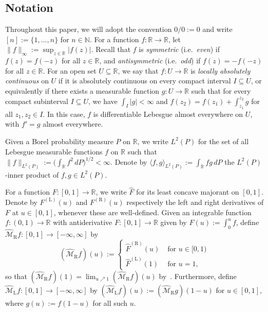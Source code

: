 \documentclass[a4paper]{article}
\newcommand{\N}{\mathbb{N}}
\newcommand{\R}{\mathbb{R}}
\newcommand{\norm}[1]{\|{#1}\|}
\newcommand{\ipr}[2]{\langle #1, #2 \rangle}
\newcommand{\nll}{\centernot{\ll}}
\theoremstyle{definition}
\begin{document}
\subsection{Notation}
\label{sec:notation}
Throughout this paper, we will adopt the convention $0/0 := 0$ and write $[n] := \{1,\dotsc,n\}$ for $n \in \N$. For a function $f \colon \R \to \R$, let $\norm{f}_\infty := \sup_{z \in \R}|f(z)|$. Recall that $f$ is \emph{symmetric} (i.e.~\textit{even}) if $f(z) = f(-z)$ for all $z \in \R$, and \emph{antisymmetric} (i.e.~\textit{odd}) if $f(z) = -f(-z)$ for all $z \in \R$. For an open set $U \subseteq \R$, we say that $f \colon U \to \R$ is \emph{locally absolutely continuous} on $U$ if it is absolutely continuous on every compact interval $I \subseteq U$, or equivalently if there exists a measurable function $g \colon U \to \R$ such that for every compact subinterval $I \subseteq U$, we have $\int_I |g| < \infty$ and $f(z_2) = f(z_1) + \int_{z_1}^{z_2} g$ for all $z_1,z_2 \in I$. In this case, $f$ is differentiable Lebesgue almost everywhere on $U$, with $f' = g$ almost everywhere.

Given a Borel probability measure $P$ on $\R$, we write $L^2(P)$ for the set of all Lebesgue measurable functions $f$ on $\R$ such that $\norm{f}_{L^2(P)} := \bigl(\int_\R f^2\,dP\bigr)^{1/2} < \infty$. Denote by $\ipr{f}{g}_{L^2(P)} := \int_\R fg\,dP$ the $L^2(P)$-inner product of $f,g \in L^2(P)$.

For a function $F \colon [0,1] \to \R$, we write $\hat{F}$ for its least concave majorant on $[0,1]$. Denote by $F^{(\mathrm{L})}(u)$ and $F^{(\mathrm{R})}(u)$ respectively the left and right derivatives of $F$ at $u \in [0,1]$, whenever these are well-defined.  Given an integrable function $f \colon (0,1) \to \R$ with antiderivative $F \colon [0,1] \to \R$ given by $F(u) := \int_0^u f$, define $\widehat{\mathcal{M}}_\mathrm{R}f \colon [0,1] \to [-\infty,\infty]$ by
\[
(\widehat{\mathcal{M}}_\mathrm{R}f)(u) := 
\begin{cases}
\hat{F}^{(\mathrm{R})}(u) \;&\text{for }u \in [0,1) \\
\hat{F}^{(\mathrm{L})}(1) \;&\text{for }u = 1,
\end{cases}
\]
so that $(\widehat{\mathcal{M}}_\mathrm{R}f)(1) = \lim_{u \nearrow 1} (\widehat{\mathcal{M}}_\mathrm{R}f)(u)$ by~\citet[Theorem~24.1]{rockafellar97convex}. Furthermore, define $\widehat{\mathcal{M}}_\mathrm{L}f \colon [0,1] \to [-\infty,\infty]$ by $(\widehat{\mathcal{M}}_\mathrm{L}f)(u) := (\widehat{\mathcal{M}}_\mathrm{R}g)(1 - u)$ for $u \in [0,1]$, where $g(u) := f(1 - u)$ for all such $u$.
\end{document}
